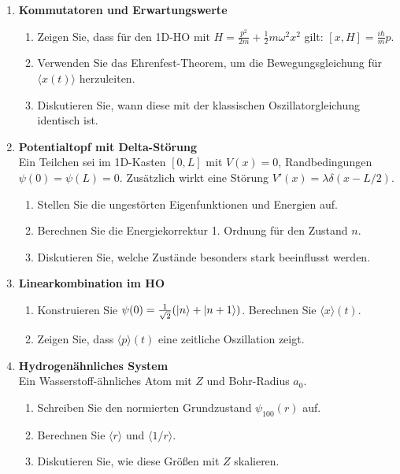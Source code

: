 \documentclass[11pt,a4paper]{article}
\begin{document}
\begin{enumerate}

\item \textbf{Kommutatoren und Erwartungswerte}\\
\begin{enumerate}
  \item Zeigen Sie, dass für den 1D-HO mit $H=\tfrac{p^2}{2m}+\tfrac12 m\omega^2x^2$ gilt:
  \([x,H]=\tfrac{i\hbar}{m}p\).
  \item Verwenden Sie das Ehrenfest-Theorem, um die Bewegungsgleichung für $\langle x(t)\rangle$ herzuleiten.
  \item Diskutieren Sie, wann diese mit der klassischen Oszillatorgleichung identisch ist.
\end{enumerate}

\item \textbf{Potentialtopf mit Delta-Störung}\\
Ein Teilchen sei im 1D-Kasten $[0,L]$ mit $V(x)=0$, Randbedingungen $\psi(0)=\psi(L)=0$.  
Zusätzlich wirkt eine Störung $V'(x)=\lambda \delta(x-L/2)$.
\begin{enumerate}
  \item Stellen Sie die ungestörten Eigenfunktionen und Energien auf.
  \item Berechnen Sie die Energiekorrektur 1. Ordnung für den Zustand $n$.
  \item Diskutieren Sie, welche Zustände besonders stark beeinflusst werden.
\end{enumerate}

\item \textbf{Linearkombination im HO}\\
\begin{enumerate}
  \item Konstruieren Sie $\psi(0)=\tfrac{1}{\sqrt2}(\ket{n}+\ket{n+1})$. Berechnen Sie $\langle x\rangle(t)$.
  \item Zeigen Sie, dass $\langle p\rangle(t)$ eine zeitliche Oszillation zeigt.
\end{enumerate}

\item \textbf{Hydrogenähnliches System}\\
Ein Wasserstoff-ähnliches Atom mit $Z$ und Bohr-Radius $a_0$.
\begin{enumerate}
  \item Schreiben Sie den normierten Grundzustand $\psi_{100}(r)$ auf.
  \item Berechnen Sie $\langle r\rangle$ und $\langle 1/r\rangle$.
  \item Diskutieren Sie, wie diese Größen mit $Z$ skalieren.
\end{enumerate}


\end{enumerate}
\end{document}

